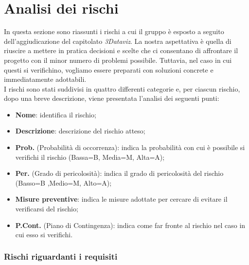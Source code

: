 \section{Analisi dei rischi}
In questa sezione sono riassunti i rischi a cui il gruppo è esposto a seguito dell'aggiudicazione del capitolato \textit{3Dataviz}.
La nostra aspettativa è quella di riuscire a mettere in pratica decisioni e scelte che ci consentano di affrontare il progetto con il minor numero di problemi possibile.
Tuttavia, nel caso in cui questi si verifichino, vogliamo essere preparati con soluzioni concrete e immediatamente adottabili.
\\I rischi sono stati suddivisi in quattro differenti categorie e, per ciascun rischio, dopo una breve descrizione, viene presentata l'analisi dei seguenti punti:
\begin{itemize}
    \item \textbf{Nome}: identifica il rischio;
    \item \textbf{Descrizione}: descrizione del rischio atteso;
    \item \textbf{Prob.} (Probabilità di occorrenza): indica la probabilità con cui è possibile si verifichi il rischio (Bassa=B, Media=M, Alta=A);
    \item \textbf{Per.} (Grado di pericolosità): indica il grado di pericolosità del rischio (Basso=B ,Medio=M, Alto=A);
    \item \textbf{Misure preventive}: indica le misure adottate per cercare di evitare il verificarsi del rischio;
    \item \textbf{P.Cont.} (Piano di Contingenza): indica come far fronte al rischio nel caso in cui esso si verifichi. 
\end{itemize}


\subsubsection{Rischi riguardanti i requisiti}

